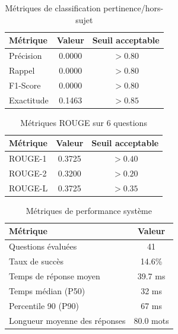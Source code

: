 
\begin{table}[h]
\centering
\caption{Métriques de classification pertinence/hors-sujet}
\label{tab:classification}
\begin{tabular}{lcc}
\hline
\textbf{Métrique} & \textbf{Valeur} & \textbf{Seuil acceptable} \\
\hline
Précision & 0.0000 & $> 0.80$ \\
Rappel & 0.0000 & $> 0.80$ \\
F1-Score & 0.0000 & $> 0.80$ \\
Exactitude & 0.1463 & $> 0.85$ \\
\hline
\end{tabular}
\end{table}

\begin{table}[h]
\centering
\caption{Métriques ROUGE sur 6 questions}
\label{tab:rouge}
\begin{tabular}{lcc}
\hline
\textbf{Métrique} & \textbf{Valeur} & \textbf{Seuil acceptable} \\
\hline
ROUGE-1 & 0.3725 & $> 0.40$ \\
ROUGE-2 & 0.3200 & $> 0.20$ \\
ROUGE-L & 0.3725 & $> 0.35$ \\
\hline
\end{tabular}
\end{table}

\begin{table}[h]
\centering
\caption{Métriques de performance système}
\label{tab:performance}
\begin{tabular}{lc}
\hline
\textbf{Métrique} & \textbf{Valeur} \\
\hline
Questions évaluées & 41 \\
Taux de succès & 14.6\% \\
Temps de réponse moyen & 39.7 ms \\
Temps médian (P50) & 32 ms \\
Percentile 90 (P90) & 67 ms \\
Longueur moyenne des réponses & 80.0 mots \\
\hline
\end{tabular}
\end{table}